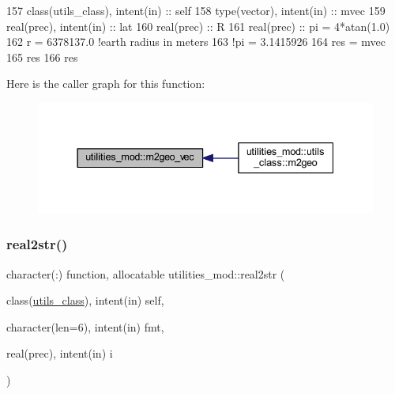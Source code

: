 \begin{DoxyCode}
157     \textcolor{keywordtype}{class}(utils\_class), \textcolor{keywordtype}{intent(in)} :: self
158     \textcolor{keywordtype}{type}(vector), \textcolor{keywordtype}{intent(in)} :: mvec
159     \textcolor{keywordtype}{real(prec)}, \textcolor{keywordtype}{intent(in)} :: lat
160     \textcolor{keywordtype}{real(prec)} :: R
161     \textcolor{keywordtype}{real(prec)} :: pi = 4*atan(1.0)
162     r = 6378137.0 \textcolor{comment}{!earth radius in meters}
163     \textcolor{comment}{!pi = 3.1415926}
164     res = mvec
165     res%
166     res%
\end{DoxyCode}
Here is the caller graph for this function\+:\nopagebreak
\begin{figure}[H]
\begin{center}
\leavevmode
\includegraphics[width=337pt]{namespaceutilities__mod_a70b21b18c8633b7fd4c3057530d3f16f_icgraph}
\end{center}
\end{figure}
\mbox{\label{namespaceutilities__mod_a2c8481f2b9f4cddf8391bd1e8b624335}} 
\subsubsection{\texorpdfstring{real2str()}{real2str()}}
{\footnotesize\ttfamily character(\+:) function, allocatable utilities\+\_\+mod\+::real2str (\begin{DoxyParamCaption}\item[{class(\mbox{\hyperlink{structutilities__mod_1_1utils__class}{utils\+\_\+class}}), intent(in)}]{self,  }\item[{character(len=6), intent(in)}]{fmt,  }\item[{real(prec), intent(in)}]{i }\end{DoxyParamCaption})\hspace{0.3cm}{\ttfamily [private]}}



